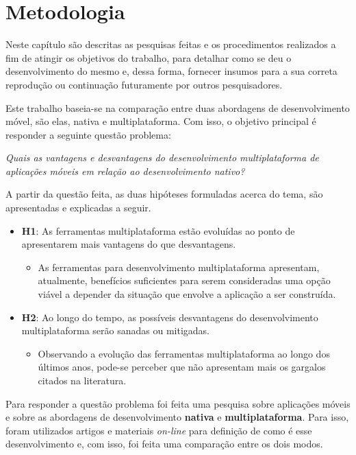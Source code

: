 \chapter{Metodologia} \label{cap:metodologia}
Neste capítulo são descritas as pesquisas feitas e os procedimentos realizados a 
fim de atingir os objetivos do trabalho, para detalhar como se deu o desenvolvimento do mesmo e, 
dessa forma, fornecer insumos para a sua correta reprodução ou continuação futuramente por outros pesquisadores.

Este trabalho baseia-se na comparação entre duas abordagens de desenvolvimento móvel, são elas, nativa e multiplataforma. 
Com isso, o objetivo principal é responder a seguinte questão problema:
\begin{center}
    \textit{Quais as vantagens e desvantagens do desenvolvimento multiplataforma de aplicações móveis em relação ao desenvolvimento nativo?}
\end{center}

A partir da questão feita, as duas hipóteses formuladas acerca do tema, são apresentadas e explicadas a seguir.

\begin{itemize}
    \item \textbf{H1}: As ferramentas multiplataforma estão evoluídas ao ponto de apresentarem mais vantagens do que desvantagens.
        \begin{itemize}
            \item As ferramentas para desenvolvimento multiplataforma apresentam, atualmente, benefícios suficientes para serem consideradas uma opção viável a depender da situação que envolve a aplicação a ser construída.
        \end{itemize}
    \item \textbf{H2}: Ao longo do tempo, as possíveis desvantagens do desenvolvimento multiplataforma serão sanadas ou mitigadas.
        \begin{itemize}
            \item Observando a evolução das ferramentas multiplataforma ao longo dos últimos anos, pode-se perceber que não apresentam mais os gargalos citados na literatura.
        \end{itemize}
\end{itemize}

Para responder a questão problema foi feita uma pesquisa sobre aplicações móveis e sobre as abordagens de desenvolvimento \textbf{nativa} e \textbf{multiplataforma}.
Para isso, foram utilizados artigos e materiais \textit{on-line} para definição de como é esse desenvolvimento e, com isso, foi feita uma comparação entre os dois modos. 


